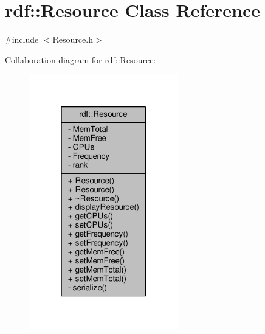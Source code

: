 \hypertarget{classrdf_1_1Resource}{}\section{rdf\+:\+:Resource Class Reference}
\label{classrdf_1_1Resource}


{\ttfamily \#include $<$Resource.\+h$>$}



Collaboration diagram for rdf\+:\+:Resource\+:
\nopagebreak
\begin{figure}[H]
\begin{center}
\leavevmode
\includegraphics[width=184pt]{classrdf_1_1Resource__coll__graph}
\end{center}
\end{figure}
